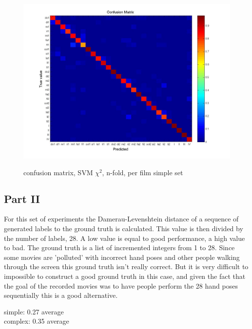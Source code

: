 \begin{figure}[htbp]
\begin{center}
\label{fig:confusion}
\includegraphics[width=\linewidth]{confmat/confusion.jpg}
\end{center}
\caption{confusion matrix, SVM $\chi^2$, n-fold, per film simple set}
\end{figure}




\subsection{Part II}

For this set of experiments the Damerau-Levenshtein distance of a sequence of generated labels to the ground truth is calculated. This value is then divided by the number of labels, 28. A low value is equal to good performance, a high value to bad. The ground truth is a list of incremented integers from 1 to 28. Since some movies are 'polluted' with incorrect hand poses and other people walking through the screen this ground truth isn't really correct. But it is very difficult to impossible to construct a good ground truth in this case, and given the fact that the goal of the recorded movies was to have people perform the 28 hand poses sequentially this is a good alternative.

simple: 0.27 average\\
complex: 0.35 average\\

